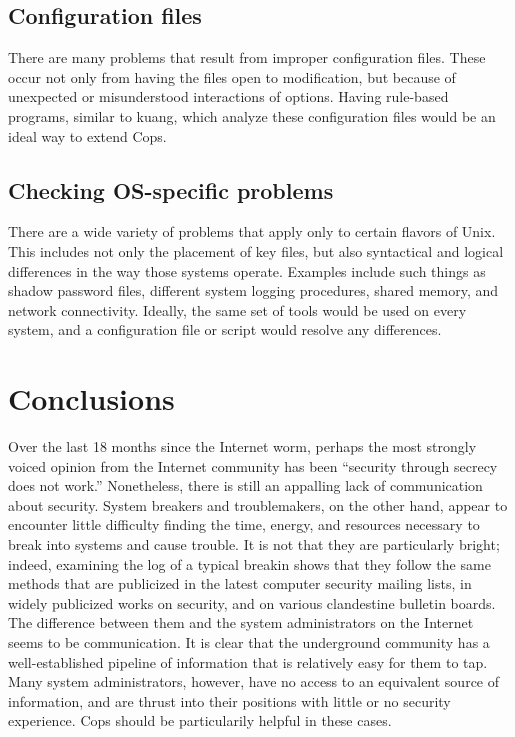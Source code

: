 \subsection{Configuration files}

There are many problems that result from improper configuration files.
These occur not only from having the files open to modification, but because
of unexpected or misunderstood interactions of options.  Having rule-based
programs, similar to  {\sf kuang}, which analyze these configuration files
would be an ideal way to extend {\sc Cops}.  

\subsection{Checking OS-specific problems}

There are a wide variety of problems that apply only to certain flavors of
{\sc Unix}.  This includes not only the placement of key files, but also
syntactical and logical differences in the way those systems operate.
Examples include such things as shadow password files, different system
logging procedures, shared memory, and network connectivity.  Ideally,
the same set of tools would be used on every system, and
a configuration file or script would resolve any differences.

\section{Conclusions}

Over the last 18 months since the Internet worm, perhaps the most
strongly voiced opinion from the Internet community has been ``security
through secrecy does not work.''  Nonetheless, there is still an
appalling lack of communication about security.
System breakers and troublemakers, on the other hand, appear to encounter
little difficulty finding the time, energy, and resources necessary to break
into systems and cause trouble.  It is not that they are particularly
bright; indeed, examining the log of a typical breakin shows that they
follow the same methods that are publicized in the latest
computer security mailing lists, in widely publicized works
on  security, and on various clandestine bulletin boards.  The
difference between them and the system administrators on the Internet
seems to be communication.  It is clear that the underground community
has a well-established pipeline of information that is relatively easy for
them to tap.  Many system administrators, however,
have no access to an equivalent source of information, and
are thrust into their positions with little or no
security experience. {\sc Cops} should be particularily helpful in these cases.

